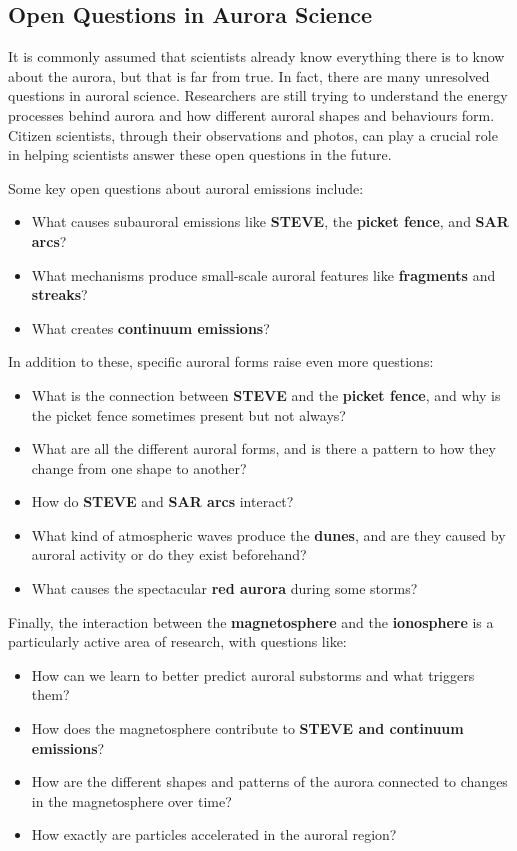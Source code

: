\documentclass{article}
\begin{document}
\subsection{Open Questions in Aurora Science}

It is commonly assumed that scientists already know everything there is to know about the aurora, but that is far from true. In fact, there are many unresolved questions in auroral science. Researchers are still trying to understand the energy processes behind aurora and how different auroral shapes and behaviours form. Citizen scientists, through their observations and photos, can play a crucial role in helping scientists answer these open questions in the future.

Some key open questions about auroral emissions include:
\begin{itemize}
    \item What causes subauroral emissions like \textbf{STEVE}, the \textbf{picket fence}, and \textbf{SAR arcs}?
    \item What mechanisms produce small-scale auroral features like \textbf{fragments} and \textbf{streaks}?
    \item What creates \textbf{continuum emissions}?
\end{itemize}

In addition to these, specific auroral forms raise even more questions:
\begin{itemize}
    \item What is the connection between \textbf{STEVE} and the \textbf{picket fence}, and why is the picket fence sometimes present but not always?
    \item What are all the different auroral forms, and is there a pattern to how they change from one shape to another?
    \item How do \textbf{STEVE} and \textbf{SAR arcs} interact?
    \item What kind of atmospheric waves produce the \textbf{dunes}, and are they caused by auroral activity or do they exist beforehand?
    \item What causes the spectacular \textbf{red aurora} during some storms?
\end{itemize}

Finally, the interaction between the \textbf{magnetosphere} and the \textbf{ionosphere} is a particularly active area of research, with questions like:
\begin{itemize}
    \item How can we learn to better predict auroral substorms and what triggers them?
    \item How does the magnetosphere contribute to \textbf{STEVE and continuum emissions}?
    \item How are the different shapes and patterns of the aurora connected to changes in the magnetosphere over time?
    \item How exactly are particles accelerated in the auroral region?

    
\end{itemize}
\end{document}
